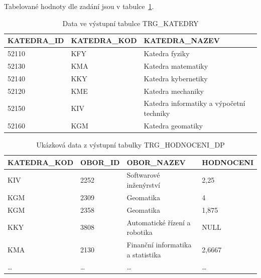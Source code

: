 Tabelované hodnoty dle zadání jsou v tabulce~\ref{table:table1}.

\begin{table}[htb]
    \centering

    \begin{tabular}{lll}
        \toprule

        KATEDRA\_ID & KATEDRA\_KOD  & KATEDRA\_NAZEV                            \\ \midrule
        52110       & KFY           & Katedra fyziky                            \\
        52130       & KMA           & Katedra matematiky                        \\
        52140       & KKY           & Katedra kybernetiky                       \\
        52120       & KME           & Katedra mechaniky                         \\
        52150       & KIV           & Katedra informatiky a výpočetní techniky  \\
        52160       & KGM           & Katedra geomatiky                         \\
          
        \bottomrule
    \end{tabular}

    \caption{Data ve výstupní tabulce TRG\_KATEDRY}
    \label{table:table1}
\end{table}
\FloatBarrier

\begin{table}[htb]
    \centering

    \begin{tabular}{llll}
        \toprule

        KATEDRA\_KOD    & OBOR\_ID  & OBOR\_NAZEV                       & HODNOCENI \\ \midrule
        KIV             & 2252      & Softwarové inženýrství            & 2,25      \\
        KGM             & 2309      & Geomatika                         & 4         \\
        KGM             & 2358      & Geomatika                         & 1,875     \\
        KKY             & 3808      & Automatické řízení a robotika     & NULL      \\
        KMA             & 2130      & Finanční informatika a statistika & 2,6667    \\
        \ldots          & \ldots    & \ldots                            & \ldots    \\

        \bottomrule
    \end{tabular}

    \caption{Ukázková data z výstupní tabulky TRG\_HODNOCENI\_DP}
    \label{table:table2}
\end{table}
\FloatBarrier

